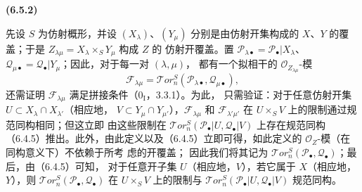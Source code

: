 \documentclass[UTF8,fontset=none,11pt,oneside,openany]{ctexbook}
\newenvironment{env}[1][]{%
  \par\medskip\noindent\textbf{(#1)}\ %
}{\par}
\newcommand{\oldpage}[2][]{%
  \hypertarget{ega-source-page-#1-#2}{}%
  \marginnote{\scriptsize\textbf{#1}~|~#2}\ignorespaces}
\begin{document}
\begin{env}[6.5.2]
先设 $S$ 为仿射概形，并设 $(X_\lambda)$、$(Y_\mu)$ 分别是由仿射开集构成的
$X$、$Y$ 的覆盖；于是 $Z_{\lambda\mu}=X_\lambda\times_S Y_\mu$ 构成 $Z$ 的
仿射开覆盖。置
$\mathscr P_{\lambda\bullet}=\mathscr P_\bullet|X_\lambda$、
$\mathscr Q_{\mu\bullet}=\mathscr Q_\bullet|Y_\mu$；因此，对于每一对 $(\lambda,\mu)$，
都有一个拟相干的 $\mathscr O_{Z_{\lambda\mu}}$-模
\[
  \mathscr F_{\lambda\mu}
  =\mathscr{T}\!or_n^S
   (\mathscr P_{\lambda\bullet},\mathscr Q_{\mu\bullet}),
\]
还需证明 $\mathscr F_{\lambda\mu}$ 满足拼接条件（$0_{\mathrm I}$，3.3.1）。为此，
只需验证：对于任意仿射开集 $U\subset X_\lambda\cap X_{\lambda'}$（相应地，
$V\subset Y_\mu\cap Y_{\mu'}$），$\mathscr F_{\lambda\mu}$ 和
$\mathscr F_{\lambda'\mu'}$ 在 $U\times_S V$ 上的限制通过规范同构相同；但这立即
由这些限制在 $\mathscr{T}\!or_n^S(\mathscr P_\bullet|U,\mathscr Q_\bullet|V)$
上存在规范同构（6.4.5）推出。此外，由此定义以及（6.4.5）立即可得，如此定义的
$\mathscr O_Z$-模（在同构意义下）不依赖于所考\oldpage[III]{149}虑的开覆盖；
因此我们将其记为
$\mathscr{T}\!or_n^S(\mathscr P_\bullet,\mathscr Q_\bullet)$；最后，由（6.4.5）可知，
对于任意开子集 $U$（相应地，$V$），若它属于 $X$（相应地，$Y$），则
$\mathscr{T}\!or_n^S(\mathscr P_\bullet,\mathscr Q_\bullet)$ 在
$U\times_S V$ 上的限制与
$\mathscr{T}\!or_n^S(\mathscr P_\bullet|U,\mathscr Q_\bullet|V)$ 规范同构。
\end{env}
\end{document}
